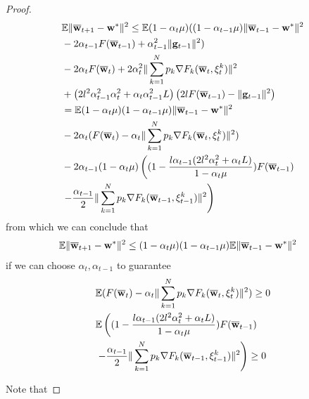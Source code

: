 \begin{proof}
	\begin{align*}
	& \mathbb{E}\|{\overline{\mathbf{w}}}_{t+1}-{\mathbf{w}}^{\ast}\|^{2}  \leq\mathbb{E}(1-\alpha_{t}\mu)((1-\alpha_{t-1}\mu)\|{\overline{\mathbf{w}}}_{t-1}-{\mathbf{w}}^{\ast}\|^{2} \\ 
	& -2\alpha_{t-1}F({\overline{\mathbf{w}}}_{t-1})+\alpha_{t-1}^{2}\|{\mathbf{g}}_{t-1}\|^{2})\\
	& -2\alpha_{t}F({\overline{\mathbf{w}}}_{t})+2\alpha_{t}^{2}\|\sum_{k=1}^{N}p_{k}\nabla F_{k}({\overline{\mathbf{w}}}_{t},\xi_{t}^{k})\|^{2}\\
	&+\left(2l^{2}\alpha_{t-1}^{2}\alpha_{t}^{2}+\alpha_{t}\alpha_{t-1}^{2}L\right)\left(2lF({\overline{\mathbf{w}}}_{t-1})-\|{\mathbf{g}}_{t-1}\|^{2}\right)\\
	& =\mathbb{E}(1-\alpha_{t}\mu)(1-\alpha_{t-1}\mu)\|{\overline{\mathbf{w}}}_{t-1}-{\mathbf{w}}^{\ast}\|^{2}\\
	& -2\alpha_{t}(F({\overline{\mathbf{w}}}_{t})-\alpha_{t}\|\sum_{k=1}^{N}p_{k}\nabla F_{k}({\overline{\mathbf{w}}}_{t},\xi_{t}^{k})\|^{2})\\
	& -2\alpha_{t-1}(1-\alpha_{t}\mu)\left((1-\frac{l\alpha_{t-1}(2l^{2}\alpha_{t}^{2}+\alpha_{t}L)}{1-\alpha_{t}\mu})F({\overline{\mathbf{w}}}_{t-1})\right. \\ 
	& \left.-\frac{\alpha_{t-1}}{2}\|\sum_{k=1}^{N}p_{k}\nabla F_{k}({\overline{\mathbf{w}}}_{t-1},\xi_{t-1}^{k})\|^{2}\right)
	\end{align*}
	from which we can conclude that 
	\begin{align*}
	\mathbb{E}\|{\overline{\mathbf{w}}}_{t+1}-{\mathbf{w}}^{\ast}\|^{2} & \leq(1-\alpha_{t}\mu)(1-\alpha_{t-1}\mu)\mathbb{E}\|{\overline{\mathbf{w}}}_{t-1}-{\mathbf{w}}^{\ast}\|^{2}
	\end{align*}
	if we can choose $\alpha_{t},\alpha_{t-1}$ to guarantee
	\begin{align*}
	&\mathbb{E}(F({\overline{\mathbf{w}}}_{t})-\alpha_{t}\|\sum_{k=1}^{N}p_{k}\nabla F_{k}({\overline{\mathbf{w}}}_{t},\xi_{t}^{k})\|^{2}) \geq0\\
	&\mathbb{E}\left((1-\frac{l\alpha_{t-1}(2l^{2}\alpha_{t}^{2}+\alpha_{t}L)}{1-\alpha_{t}\mu})F({\overline{\mathbf{w}}}_{t-1}) \right. \\
	& \left.-\frac{\alpha_{t-1}}{2}\|\sum_{k=1}^{N}p_{k}\nabla F_{k}({\overline{\mathbf{w}}}_{t-1},\xi_{t-1}^{k})\|^{2}\right) \geq0
	\end{align*}
	
	Note that 
	

\end{proof}
